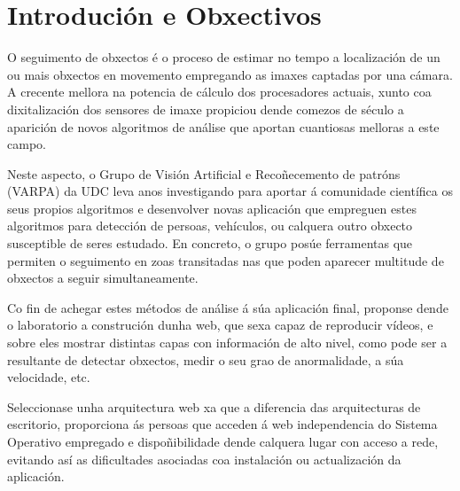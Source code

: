 \chapter{Introdución e Obxectivos}

O seguimento de obxectos é o proceso de estimar no tempo a localización de un ou mais 
obxectos en movemento empregando as imaxes captadas por una cámara. A crecente mellora 
na potencia de cálculo dos procesadores actuais, xunto coa dixitalización dos sensores 
de imaxe propiciou dende comezos de século a aparición de novos algoritmos de análise 
que aportan cuantiosas melloras a este campo.

Neste aspecto, o Grupo de Visión Artificial e Recoñecemento de patróns (VARPA)
da UDC leva anos investigando para aportar á comunidade científica os seus propios algoritmos
e desenvolver novas aplicación que empreguen estes algoritmos para detección de persoas,
vehículos, ou calquera outro obxecto susceptible de seres estudado. En concreto, o
grupo posúe ferramentas que permiten o seguimento en zoas transitadas nas que poden 
aparecer multitude de obxectos a seguir simultaneamente. 

Co fin de achegar estes métodos de análise á súa aplicación final, proponse dende o 
laboratorio a construción dunha web, que sexa capaz de reproducir vídeos, e sobre eles
mostrar distintas capas con información de alto nivel, como pode ser a resultante de
detectar obxectos, medir o seu grao de anormalidade, a súa velocidade, etc. 

Seleccionase unha arquitectura web xa que a diferencia das arquitecturas de escritorio,
proporciona ás persoas que acceden á web independencia do Sistema Operativo empregado e
dispoñibilidade dende calquera lugar con acceso a rede, evitando así as dificultades 
asociadas coa instalación ou actualización da aplicación. 
